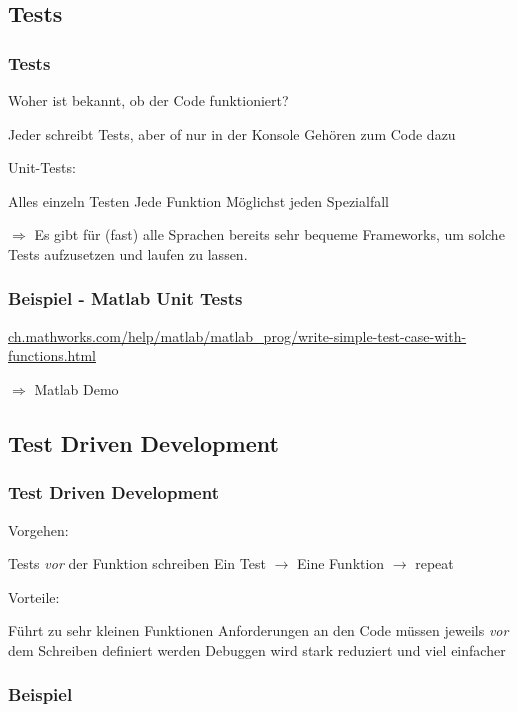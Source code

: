 \documentclass[handout]{beamer}
\begin{document}
\subsection{Tests}
\begin{frame}
    \frametitle{Tests}
    Woher ist bekannt, ob der Code funktioniert?\pause

    \begin{outline}
        \1 Jeder schreibt Tests, aber of nur in der Konsole
        \1 Gehören zum Code dazu
    \end{outline} \pause

    Unit-Tests:
    \begin{outline}
        \1 Alles einzeln Testen
            \2 Jede Funktion
            \2 Möglichst jeden Spezialfall
    \end{outline}
    $\Rightarrow$ Es gibt für (fast) alle Sprachen bereits sehr bequeme
    Frameworks, um solche Tests aufzusetzen und laufen zu lassen.
\end{frame}
\begin{frame}
    \frametitle{Beispiel - Matlab Unit Tests}
    \url{ch.mathworks.com/help/matlab/matlab_prog/write-simple-test-case-with-functions.html}
    \vspace{2em}

    $\Rightarrow$ Matlab Demo
\end{frame}
\subsection{Test Driven Development}
\begin{frame}
    \frametitle{Test Driven Development}
    Vorgehen:

    \begin{outline}
        \1 Tests \emph{vor} der Funktion schreiben
        \1 Ein Test $\rightarrow$ Eine Funktion $\rightarrow$ repeat
    \end{outline}\pause

    Vorteile:

    \begin{outline}
        \1 Führt zu sehr kleinen Funktionen
        \1 Anforderungen an den Code müssen jeweils \emph{vor} dem Schreiben
        definiert werden
        \1 Debuggen wird stark reduziert und viel einfacher
    \end{outline}
\end{frame}
\begin{frame}
    \frametitle{Beispiel}
\end{frame}
\end{document}
